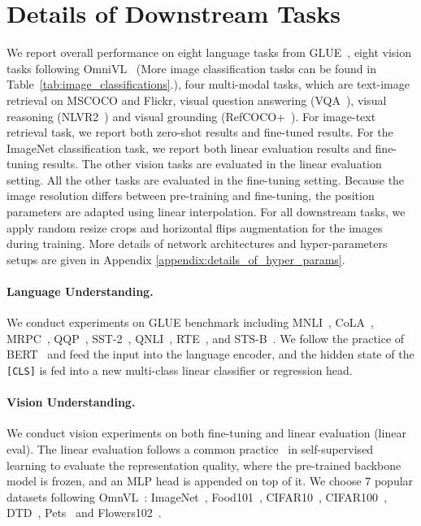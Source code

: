 \documentclass[11pt]{article}
\begin{document}
\section{Details of Downstream Tasks}
\label{appendix:details_of_downstream_tasks}

We report overall performance on eight language tasks from GLUE~\cite{wang2018glue}, eight vision tasks following OmniVL~\cite{wang2022omnivl} (More image classification tasks can be found in Table~\ref{tab:image_classifications}.), four multi-modal tasks, which are text-image retrieval on MSCOCO and Flickr, visual question answering (VQA~\cite{goyal2017making}), visual reasoning (NLVR2~\cite{suhr2019corpus}) and visual grounding (RefCOCO+~\cite{yu2016modeling}). For image-text retrieval task, we report both zero-shot results and fine-tuned results. For the ImageNet classification task, we report both linear evaluation results and fine-tuning results. The other vision tasks are evaluated in the linear evaluation setting. All the other tasks are evaluated in the fine-tuning setting.
Because the image resolution differs between pre-training and fine-tuning, the position parameters are adapted using linear interpolation.
For all downstream tasks, we apply random resize crops and horizontal flips augmentation for the images during training. More details of network architectures and hyper-parameters setups are given in Appendix \ref{appendix:details_of_hyper_params}.

\paragraph{Language Understanding. \newline} 
We conduct experiments on GLUE benchmark including MNLI~\citep{williams2018broad}, CoLA~\citep{warstadt2019neural}, MRPC~\citep{dolan2005automatically}, QQP~\citep{iyer2017first}, SST-2~\citep{socher2013recursive}, QNLI~\citep{rajpurkar2016squad}, RTE~\citep{dagan2005pascal,haim2006second,giampiccolo2007third,bentivogli2009fifth}, and STS-B~\citep{agirre2007proceedings}. 
We follow the practice of BERT~\citep{devlin2018bert, liu2019roberta} and feed the input into the language encoder, and the hidden state of the \texttt{[CLS]} is fed into a new multi-class linear classifier or regression head.


\paragraph{Vision Understanding. \newline}
We conduct vision experiments on both fine-tuning and linear evaluation (linear eval).
The linear evaluation follows a common practice~\citep{caron2021emerging, he2020momentum, singh2021flava} in self-supervised learning to evaluate the representation quality, where the pre-trained backbone model is frozen, and an MLP head is appended on top of it.
We choose 7 popular datasets following OmnVL~\citep{wang2022omnivl}:
ImageNet~\citep{russakovsky2015imagenet}, Food101~\citep{bossard2014food}, CIFAR10~\citep{krizhevsky2009learning}, CIFAR100~\citep{krizhevsky2009learning}, DTD~\citep{cimpoi2014describing}, Pets~\citep{parkhi2012cats} and  Flowers102~\citep{nilsback2008automated}.
\end{document}
